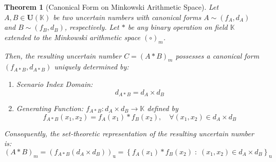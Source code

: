 \documentclass[a4paper,12pt, twoside]{memoir}
\newtheorem{theorem}{Theorem}[chapter]
\newcommand{\set}[1]{\left\{#1\right\}} %
\newcommand{\s}[1]{\set{#1}_\mathrm{u}} %
\newcommand{\bd}[1]{\left(#1\right)_\mathrm{u}} %
\newcommand{\tsbd}[1]{\mathbf{U}(\mathbb{#1})}
\newcommand{\kgdt}[1]{\left(#1\right)_m} %
\begin{document}
\begin{theorem}[Canonical Form on Minkowski Arithmetic Space]
	\label{thm:minkowski_canonical_form}
	Let $A, B \in \tsbd{K}$ be two uncertain numbers with canonical forms $A \sim (f_A, d_A)$ and $B \sim (f_B, d_B)$, respectively. Let $*$ be any binary operation on field $\mathbb{K}$ extended to the Minkowski arithmetic space $(\circ)_m$.

	Then, the resulting uncertain number $C = \kgdt{A * B}$ possesses a canonical form $(f_{A*B}, d_{A*B})$ uniquely determined by:
	\begin{enumerate}[leftmargin=*]
		\item Scenario Index Domain:
		      \[
			      d_{A*B} = d_A \times d_B
		      \]
		\item Generating Function: $f_{A*B} : d_A \times d_B \to \mathbb{K}$ defined by
		      \[
			      f_{A*B}(x_1, x_2) = f_A(x_1) * f_B(x_2), \quad \forall (x_1, x_2) \in d_A \times d_B
		      \]
	\end{enumerate}
	Consequently, the set-theoretic representation of the resulting uncertain number is:
	\[
		\kgdt{A * B} = \bd{f_{A*B}(d_A \times d_B)} = \s{f_A(x_1) * f_B(x_2) \;:\; (x_1, x_2) \in d_A \times d_B}
	\]
\end{theorem}
\end{document}
